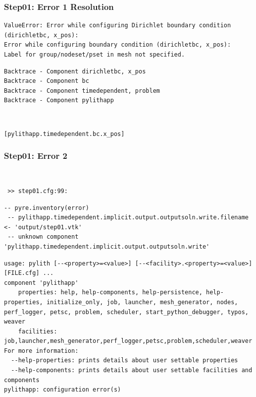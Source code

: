 \documentclass{beamer}
\begin{document}
\begin{frame}[fragile]
  \frametitle{Step01: Error 1 Resolution}

\begin{lstlisting}
ValueError: Error while configuring Dirichlet boundary condition (dirichletbc, x_pos):
Error while configuring boundary condition (dirichletbc, x_pos):
Label for group/nodeset/pset in mesh not specified.
\end{lstlisting}
\begin{lstlisting}
Backtrace - Component dirichletbc, x_pos
Backtrace - Component bc
Backtrace - Component timedependent, problem
Backtrace - Component pylithapp
\end{lstlisting}\pause
{} \pause\\
\begin{lstlisting}
[pylithapp.timedependent.bc.x_pos]
\end{lstlisting}


\end{frame}


\begin{frame}[fragile]
  \frametitle{Step01: Error 2}

\\
\begin{lstlisting}
 >> step01.cfg:99:
\end{lstlisting}
\begin{lstlisting}
-- pyre.inventory(error)
 -- pylithapp.timedependent.implicit.output.outputsoln.write.filename <- 'output/step01.vtk'
 -- unknown component
'pylithapp.timedependent.implicit.output.outputsoln.write'
\end{lstlisting}
\begin{lstlisting}
usage: pylith [--<property>=<value>] [--<facility>.<property>=<value>] [FILE.cfg] ...
component 'pylithapp'
    properties: help, help-components, help-persistence, help-properties, initialize_only, job, launcher, mesh_generator, nodes, perf_logger, petsc, problem, scheduler, start_python_debugger, typos, weaver
    facilities: job,launcher,mesh_generator,perf_logger,petsc,problem,scheduler,weaver
For more information:
  --help-properties: prints details about user settable properties
  --help-components: prints details about user settable facilities and components
pylithapp: configuration error(s)
\end{lstlisting}
  
\end{frame}
\end{document}

